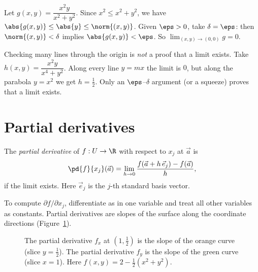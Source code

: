 \begin{example}
Let $g(x,y)=\dfrac{x^2y}{x^2+y^2}$. Since $x^2\le x^2+y^2$, we have $\abs{g(x,y)}\le\abs{y}\le\norm{(x,y)}$. Given $\eps>0$, take $\delta=\eps$: then $\norm{(x,y)}<\delta$ implies $\abs{g(x,y)}<\eps$. So $\lim_{(x,y)\to(0,0)}g=0$.
\end{example}

\begin{pitfall}
Checking many lines through the origin is \emph{not} a proof that a limit exists. Take $h(x,y)=\dfrac{x^2y}{x^4+y^2}$. Along every line $y=mx$ the limit is $0$, but along the parabola $y=x^2$ we get $h=\tfrac12$. Only an $\eps$--$\delta$ argument (or a squeeze) proves that a limit exists.
\end{pitfall}

\section{Partial derivatives}

\begin{definition}
The \emph{partial derivative} of $f:U\to\R$ with respect to $x_j$ at $\vec a$ is
\[
\pd{f}{x_j}(\vec a)=\lim_{h\to0}\frac{f(\vec a+h\,\vec e_j)-f(\vec a)}{h},
\]
if the limit exists. Here $\vec e_j$ is the $j$-th standard basis vector.
\end{definition}

To compute $\partial f/\partial x_j$, differentiate as in one variable and treat all other variables as constants. Partial derivatives are slopes of the surface along the coordinate directions (Figure~\ref{fig:partials}).

\begin{figure}[ht]
\centering
{}
\caption{The partial derivative $f_x$ at $(1,\tfrac12)$ is the slope of the orange curve (slice $y=\tfrac12$). The partial derivative $f_y$ is the slope of the green curve (slice $x=1$). Here $f(x,y)=2-\tfrac12(x^2+y^2)$.}
\label{fig:partials}
\end{figure}

